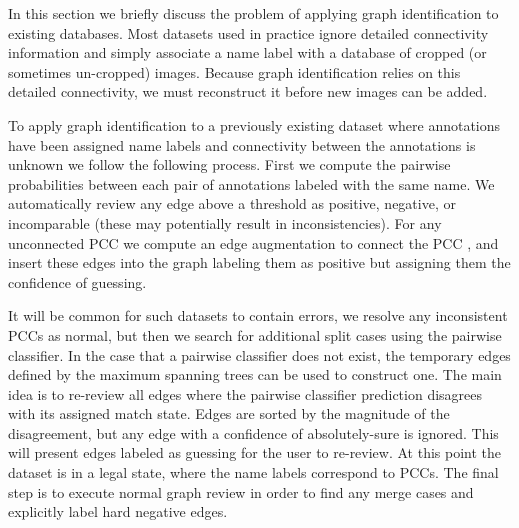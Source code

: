 In this section we briefly discuss the problem of applying graph identification to existing databases.
Most datasets used in practice ignore detailed connectivity information and simply associate a name label with a
  database of cropped (or sometimes un-cropped) images.
Because graph identification relies on this detailed connectivity, we must reconstruct it before new images can
  be added.


To apply graph identification to a previously existing dataset where annotations have been assigned name labels and
connectivity between the annotations is unknown we follow the following process. First we compute the pairwise
probabilities between each pair of annotations labeled with the same name. We automatically review any edge above a
threshold as positive, negative, or incomparable (these may potentially result in inconsistencies). For any unconnected
PCC we compute an edge augmentation to connect the PCC \cite{eswaran_augmentation_1976,khuller_approximation_1993}, and
insert these edges into the graph labeling them as positive but assigning them the confidence of guessing.

It will be common for such datasets to contain errors, we resolve any inconsistent PCCs as normal, but then we search
for additional split cases using the pairwise classifier. In the case that a pairwise classifier does not exist, the
temporary edges defined by the maximum spanning trees can be used to construct one. The main idea is to re-review all
edges where the pairwise classifier prediction disagrees with its assigned match state. Edges are sorted by the
magnitude of the disagreement, but any edge with a confidence of absolutely-sure is ignored. This will present edges
labeled as guessing for the user to re-review. At this point the dataset is in a legal state, where the name labels
correspond to PCCs. The final step is to execute normal graph review in order to find any merge cases and explicitly
label hard negative edges.

